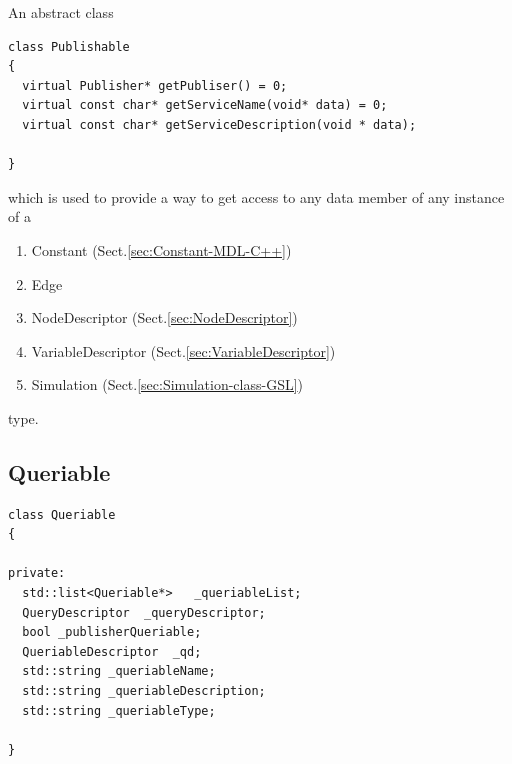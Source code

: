 An abstract class
\begin{lstlisting}
class Publishable
{
  virtual Publisher* getPubliser() = 0;
  virtual const char* getServiceName(void* data) = 0;
  virtual const char* getServiceDescription(void * data);

}
\end{lstlisting}

which is used to provide a way to get access to any data member of
any instance of a 
\begin{enumerate}
  \item Constant (Sect.\ref{sec:Constant-MDL-C++})
  \item Edge
  \item NodeDescriptor (Sect.\ref{sec:NodeDescriptor})
  \item VariableDescriptor (Sect.\ref{sec:VariableDescriptor})
  \item Simulation (Sect.\ref{sec:Simulation-class-GSL})
\end{enumerate}
type.

\subsection{Queriable}
\label{sec:Queriable}

\begin{lstlisting}
class Queriable
{

private:
  std::list<Queriable*>   _queriableList;
  QueryDescriptor  _queryDescriptor;
  bool _publisherQueriable;
  QueriableDescriptor  _qd;
  std::string _queriableName;
  std::string _queriableDescription;
  std::string _queriableType;
  
}
\end{lstlisting}


